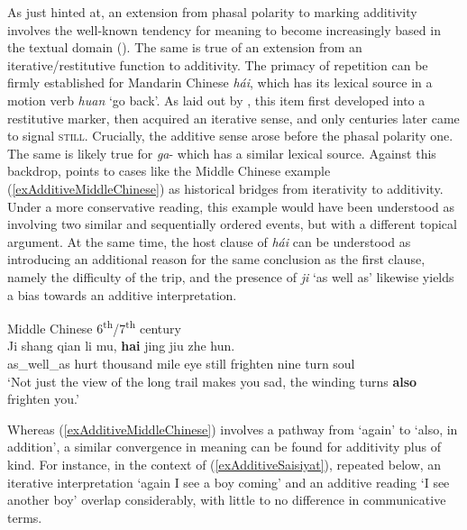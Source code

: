 {As just hinted at, an extension from phasal polarity to marking additivity involves the well-known tendency for meaning to become increasingly based in the textual domain (). The same is true of an extension from an iterative/restitutive function to additivity. The primacy of repetition can be firmly established for Mandarin Chinese \textit{hái}, which has its lexical source in a motion verb \textit{huan} \lq go back\rq{}. As laid out by \textcite{Yeh1998}, this item first developed into a restitutive marker, then acquired an iterative sense, and only centuries later came to signal \textsc{still}. Crucially, the additive sense arose before the phasal polarity one. The same is likely true for  \mbox{\textit{ga}-} which has a similar lexical source. Against this backdrop, \textcite{Yeh1998} points to cases like the Middle Chinese  example (\ref{exAdditiveMiddleChinese}) as historical bridges from iterativity to additivity. Under a more conservative reading, this example would have been understood as involving two similar and sequentially ordered events, but with a different topical argument. At the same time, the host clause of \textit{hái} can be understood as introducing an additional reason for the same conclusion as the first clause, namely the difficulty of the trip, and the presence of \textit{ji} \lq as well as\rq{ }likewise yields a bias towards an additive interpretation.

\begin{exe}
	\ex Middle Chinese\label{exAdditiveMiddleChinese} 6\textsuperscript{th}/7\textsuperscript{th} century\\
	\gll Ji shang qian li mu, \textbf{hai} jing jiu zhe hun.\\
	as\_well\_as hurt thousand mile eye still frighten nine turn soul\\
	\glt \lq Not just the view of the long trail makes you sad, the winding turns \textbf{also} frighten you.\rq{ }\parencite[245]{Yeh1998}
\end{exe}

Whereas (\ref{exAdditiveMiddleChinese}) involves a pathway from \lq again\rq{ }to \lq also, in addition\rq{}, a similar convergence in meaning can be found for additivity plus  of kind. For instance, in the context of (\ref{exAdditiveSaisiyat}), repeated below, 
an iterative interpretation \lq again I see a boy coming\rq{ }and an additive reading \lq I see another boy\rq{ }overlap considerably, with little to no difference in communicative terms.

}
